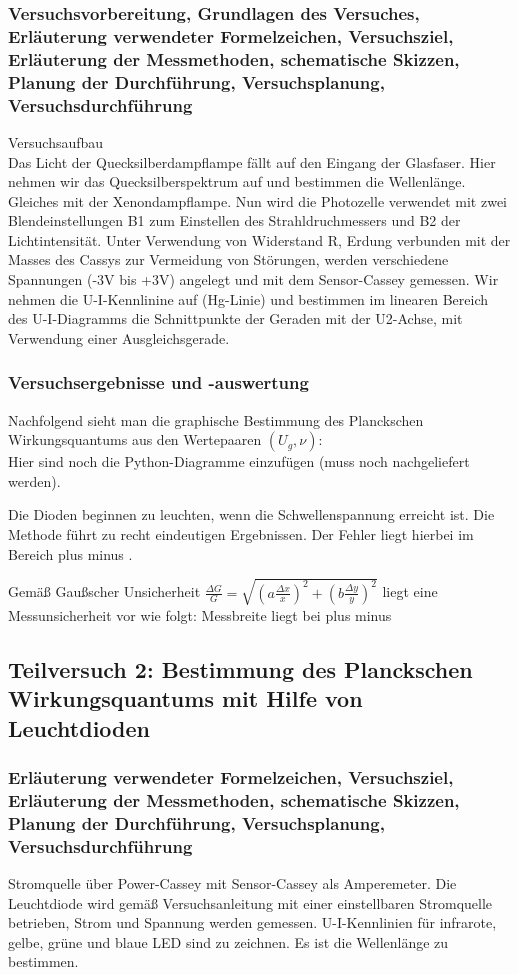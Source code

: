 \documentclass[12pt,oneside,oldfontcommands]{memoir}
\begin{document}
\subsubsection{Versuchsvorbereitung, Grundlagen des Versuches, Erläuterung verwendeter Formelzeichen, Versuchsziel, Erläuterung der Messmethoden, schematische Skizzen, Planung der Durchführung, Versuchsplanung, Versuchsdurchführung}
Versuchsaufbau\\
Das Licht der Quecksilberdampflampe fällt auf den Eingang der Glasfaser. Hier nehmen wir das Quecksilberspektrum auf und bestimmen die Wellenlänge. Gleiches mit der Xenondampflampe.
Nun wird die Photozelle verwendet mit zwei Blendeinstellungen B1 zum Einstellen des Strahldruchmessers und B2 der Lichtintensität. Unter Verwendung von Widerstand R, Erdung verbunden mit der Masses des Cassys zur Vermeidung von Störungen, werden verschiedene Spannungen (-3V bis +3V) angelegt und mit dem Sensor-Cassey gemessen.
Wir nehmen die U-I-Kennlinine auf (Hg-Linie) und bestimmen im linearen Bereich des U-I-Diagramms die Schnittpunkte der Geraden mit der U2-Achse, mit Verwendung einer Ausgleichsgerade.


\subsubsection{Versuchsergebnisse und -auswertung}
Nachfolgend sieht man die graphische Bestimmung des Planckschen Wirkungsquantums aus den Wertepaaren $(U_g,\nu)$:\\

Hier sind noch die Python-Diagramme einzufügen (muss noch nachgeliefert werden).

Die Dioden beginnen zu leuchten, wenn die Schwellenspannung erreicht ist. 
Die Methode führt zu recht eindeutigen Ergebnissen. Der Fehler liegt hierbei im Bereich plus minus .

Gemäß Gaußscher Unsicherheit $\frac{\Delta G}{G} = \sqrt{(a\frac{\Delta x}{x})^2 + (b \frac{\Delta y}{y})^2}$ liegt eine Messunsicherheit vor wie folgt:
Messbreite liegt bei plus minus 

\subsection{Teilversuch 2: Bestimmung des Planckschen Wirkungsquantums mit Hilfe von Leuchtdioden}
\subsubsection{Erläuterung verwendeter Formelzeichen, Versuchsziel, Erläuterung der Messmethoden, schematische Skizzen, Planung der Durchführung, Versuchsplanung, Versuchsdurchführung}
Stromquelle über Power-Cassey mit Sensor-Cassey als Amperemeter. Die Leuchtdiode wird gemäß Versuchsanleitung mit einer einstellbaren Stromquelle betrieben, Strom und Spannung werden gemessen. U-I-Kennlinien für infrarote, gelbe, grüne und blaue LED sind zu zeichnen.
Es ist die Wellenlänge zu bestimmen.
\end{document}
